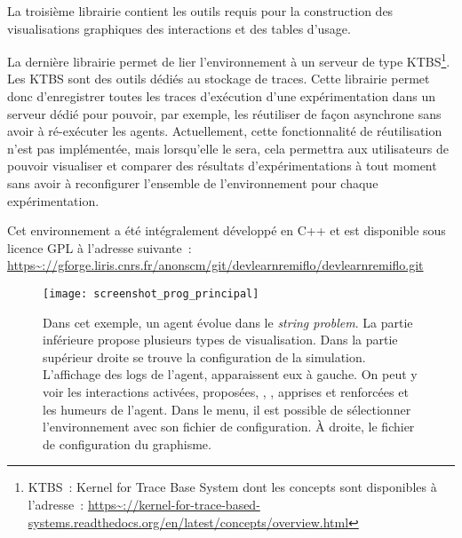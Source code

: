 \documentclass{llncs}
\begin{document}
La troisième librairie contient les outils requis pour la construction des visualisations graphiques des interactions et des tables d'usage.
 
La dernière librairie permet de lier l'environnement à un serveur de type KTBS\footnote{KTBS~: Kernel for Trace Base System dont les concepts sont disponibles à l'adresse~:
  \url{https~://kernel-for-trace-based-systems.readthedocs.org/en/latest/concepts/overview.html}}.
Les KTBS sont des outils dédiés au stockage de traces.
Cette librairie permet donc d'enregistrer toutes les traces d'exécution d'une expérimentation dans un serveur dédié pour pouvoir, par exemple, les réutiliser de façon asynchrone sans avoir à ré-exécuter les agents.
Actuellement, cette fonctionnalité de réutilisation n'est pas implémentée, mais lorsqu'elle le sera, cela permettra aux utilisateurs de pouvoir visualiser et comparer des résultats d'expérimentations à tout moment sans avoir à reconfigurer l'ensemble de l'environnement pour chaque expérimentation. 

Cet environnement a été intégralement développé en C++ et est disponible sous licence GPL à l'adresse suivante~: \url{https~://gforge.liris.cnrs.fr/anonscm/git/devlearnremiflo/devlearnremiflo.git}



\begin{landscape}
	\begin{figure}
		\centering
		\texttt{[image: screenshot\_prog\_principal]}
		\caption[Exemple d'interface de l'environnement de développement]{Dans cet exemple, un agent évolue dans le \emph{string problem}. La partie inférieure propose plusieurs types de visualisation. Dans la partie supérieur droite se trouve la configuration de la simulation. L'affichage des logs de l'agent, apparaissent eux à gauche. On peut y voir les interactions activées, proposées, \intended, \enacted, apprises et renforcées et les humeurs de l'agent. Dans le menu, il est possible de sélectionner l'environnement avec son fichier de configuration. À droite, le fichier de configuration du graphisme. 
                } %
                
		\label{fig:screenshot_prog_principal}
	\end{figure}
\end{landscape}
\end{document}

